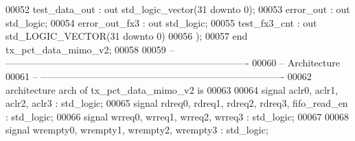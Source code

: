 \begin{DoxyCode}
00052           \textcolor{vhdlchar}{test_data_out} \textcolor{vhdlchar}{:} \textcolor{keywordflow}{out} \textcolor{comment}{std\_logic\_vector}\textcolor{vhdlchar}{(}\textcolor{vhdllogic}{}\textcolor{vhdllogic}{31} \textcolor{keywordflow}{downto} \textcolor{vhdllogic}{}\textcolor{vhdllogic}{0}\textcolor{vhdlchar}{)};
00053           \textcolor{vhdlchar}{error_out}         \textcolor{vhdlchar}{:} \textcolor{keywordflow}{out} \textcolor{comment}{std\_logic};
00054           \textcolor{vhdlchar}{error_out_fx3} \textcolor{vhdlchar}{:} \textcolor{keywordflow}{out} \textcolor{comment}{std\_logic};
00055           \textcolor{vhdlchar}{test_fx3_cnt}      \textcolor{vhdlchar}{:} \textcolor{keywordflow}{out} \textcolor{comment}{std\_LOGIC\_VECTOR}\textcolor{vhdlchar}{(}\textcolor{vhdllogic}{}\textcolor{vhdllogic}{31} \textcolor{keywordflow}{downto} \textcolor{vhdllogic}{}\textcolor{vhdllogic}{0}\textcolor{vhdlchar}{)}
00056         \textcolor{vhdlchar}{)};
00057 \textcolor{keywordflow}{end} \textcolor{vhdlchar}{tx\_pct\_data\_mimo\_v2};
00058 
00059 \textcolor{keyword}{-- ----------------------------------------------------------------------------}
00060 \textcolor{keyword}{-- Architecture}
00061 \textcolor{keyword}{-- ----------------------------------------------------------------------------}
00062 \textcolor{keywordflow}{architecture} arch \textcolor{keywordflow}{of} tx_pct_data_mimo_v2 is
00063   
00064   \textcolor{keywordflow}{signal} \textcolor{vhdlchar}{aclr0}\textcolor{vhdlchar}{,} \textcolor{vhdlchar}{aclr1}\textcolor{vhdlchar}{,} \textcolor{vhdlchar}{aclr2}\textcolor{vhdlchar}{,} \textcolor{vhdlchar}{aclr3}          \textcolor{vhdlchar}{:} \textcolor{comment}{std\_logic};
00065   \textcolor{keywordflow}{signal} \textcolor{vhdlchar}{rdreq0}\textcolor{vhdlchar}{,} \textcolor{vhdlchar}{rdreq1}\textcolor{vhdlchar}{,} \textcolor{vhdlchar}{rdreq2}\textcolor{vhdlchar}{,} \textcolor{vhdlchar}{rdreq3}\textcolor{vhdlchar}{,} \textcolor{vhdlchar}{fifo_read_en}      \textcolor{vhdlchar}{:} \textcolor{comment}{std\_logic};
00066   \textcolor{keywordflow}{signal} \textcolor{vhdlchar}{wrreq0}\textcolor{vhdlchar}{,} \textcolor{vhdlchar}{wrreq1}\textcolor{vhdlchar}{,} \textcolor{vhdlchar}{wrreq2}\textcolor{vhdlchar}{,} \textcolor{vhdlchar}{wrreq3}      \textcolor{vhdlchar}{:} \textcolor{comment}{std\_logic};
00067   
00068   \textcolor{keywordflow}{signal} \textcolor{vhdlchar}{wrempty0}\textcolor{vhdlchar}{,} \textcolor{vhdlchar}{wrempty1}\textcolor{vhdlchar}{,} \textcolor{vhdlchar}{wrempty2}\textcolor{vhdlchar}{,} \textcolor{vhdlchar}{wrempty3} \textcolor{vhdlchar}{:} \textcolor{comment}{std\_logic};

\end{DoxyCode}
